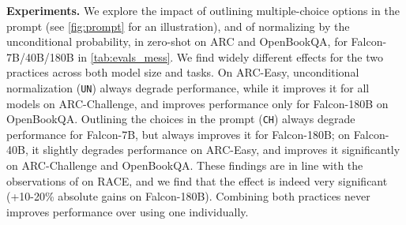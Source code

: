 \documentclass{article}
\begin{document}
\textbf{Experiments.} We explore the impact of outlining multiple-choice options in the prompt (see \cref{fig:prompt} for an illustration), and of normalizing by the unconditional probability, in zero-shot on ARC and OpenBookQA, for Falcon-7B/40B/180B in \cref{tab:evals_mess}. We find widely different effects for the two practices across both model size and tasks. On ARC-Easy, unconditional normalization (\texttt{UN}) always degrade performance, while it improves it for all models on ARC-Challenge, and improves performance only for Falcon-180B on OpenBookQA. Outlining the choices in the prompt (\texttt{CH}) always degrade performance for Falcon-7B, but always improves it for Falcon-180B; on Falcon-40B, it slightly degrades performance on ARC-Easy, and improves it significantly on ARC-Challenge and OpenBookQA. These findings are in line with the observations of \citet{gopher} on RACE, and we find that the effect is indeed very significant (+10-20\% absolute gains on Falcon-180B). Combining both practices never improves performance over using one individually. 
\end{document}
